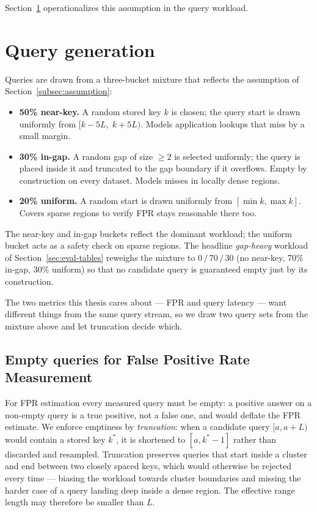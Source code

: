 Section~\ref{sec:query-distribution} operationalizes this assumption
in the query workload.

\section{Query generation}\label{sec:query-distribution}

Queries are drawn from a three-bucket mixture that reflects
the assumption of Section~\ref{subsec:assumption}:

\begin{itemize}
    \item \textbf{50\% near-key.}
    A random stored key $k$ is chosen; the query start is drawn
    uniformly from $[k - 5L,\; k + 5L)$.
    Models application lookups that miss by a small margin.
    \item \textbf{30\% in-gap.}
    A random gap of size $\geq 2$ is selected uniformly; the query
    is placed inside it and truncated to the gap boundary if it
    overflows. Empty by construction on every dataset.
    Models misses in locally dense regions.
    \item \textbf{20\% uniform.}
    A random start is drawn uniformly from $[\min k, \max k]$.
    Covers sparse regions to verify FPR stays reasonable there too.
\end{itemize}

The near-key and in-gap buckets reflect the dominant workload;
the uniform bucket acts as a safety check on sparse regions.
The headline \emph{gap-heavy} workload of
Section~\ref{sec:eval-tables} reweighs the mixture to
$0\,/\,70\,/\,30$ (no near-key, 70\% in-gap, 30\% uniform) so that no
candidate query is guaranteed empty just by its construction.

The two metrics this thesis cares about --- FPR and query latency
--- want different things from the same query stream, so we draw
two query sets from the mixture above and let truncation decide
which.

\subsection{Empty queries for False Positive Rate Measurement}
\label{subsec:queries-empty}

For FPR estimation every measured query must be empty: a positive
answer on a non-empty query is a true positive, not a false one,
and would deflate the FPR estimate. We enforce emptiness by
\emph{truncation}: when a candidate query $[a, a+L)$ would contain
a stored key $k^*$, it is shortened to $[a, k^* - 1]$ rather than
discarded and resampled. Truncation preserves queries that start
inside a cluster and end between two closely spaced keys, which
would otherwise be rejected every time --- biasing the workload
towards cluster boundaries and missing the harder case of a query
landing deep inside a dense region. The effective range length
may therefore be smaller than $L$.

